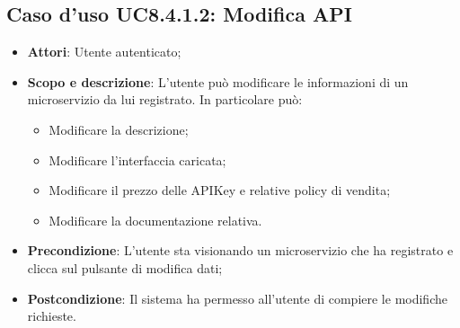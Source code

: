 \documentclass[12pt,a4paper,titlepage]{article}
\begin{document}
	\subsection{Caso d'uso UC8.4.1.2: Modifica API}
	\label{UC8.4.1.2}
	\begin{itemize}
		\item \textbf{Attori}: Utente autenticato;
		\item \textbf{Scopo e descrizione}: L'utente può modificare le informazioni di un microservizio da lui registrato. In particolare può:
		\begin{itemize}
			\item Modificare la descrizione;
			\item Modificare l'interfaccia caricata;
			\item Modificare il prezzo delle APIKey e relative policy di vendita;
			\item Modificare la documentazione relativa.
		\end{itemize}
		\item \textbf{Precondizione}: L'utente sta visionando un microservizio che ha registrato e clicca sul pulsante di modifica dati;
		\item \textbf{Postcondizione}: Il sistema ha permesso all'utente di compiere le modifiche richieste.
	\end{itemize}
\end{document}
